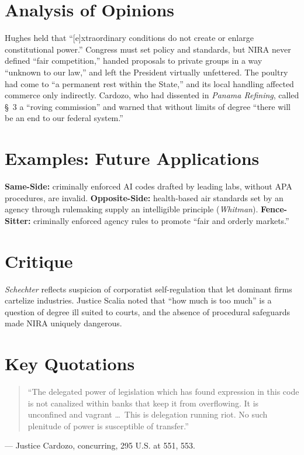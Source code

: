 \documentclass[12pt]{article}
\begin{document}
\section{Analysis of Opinions}
Hughes held that ``[e]xtraordinary conditions do not create or enlarge constitutional power.'' Congress must set policy and standards, but NIRA never defined ``fair competition,'' handed proposals to private groups in a way ``unknown to our law,'' and left the President virtually unfettered. The poultry had come to ``a permanent rest within the State,'' and its local handling affected commerce only indirectly. Cardozo, who had dissented in \textit{Panama Refining}, called \S~3 a ``roving commission'' and warned that without limits of degree ``there will be an end to our federal system.''

\section{Examples: Future Applications}
\textbf{Same-Side:} criminally enforced AI codes drafted by leading labs, without APA procedures, are invalid. \textbf{Opposite-Side:} health-based air standards set by an agency through rulemaking supply an intelligible principle (\textit{Whitman}). \textbf{Fence-Sitter:} criminally enforced agency rules to promote ``fair and orderly markets.''

\section{Critique}
\textit{Schechter} reflects suspicion of corporatist self-regulation that let dominant firms cartelize industries. Justice Scalia noted that ``how much is too much'' is a question of degree ill suited to courts, and the absence of procedural safeguards made NIRA uniquely dangerous.

\section{Key Quotations}
\begin{quote}
``The delegated power of legislation which has found expression in this code is not canalized within banks that keep it from overflowing. It is unconfined and vagrant \dots\ This is delegation running riot. No such plenitude of power is susceptible of transfer.''
\end{quote}
\noindent --- Justice Cardozo, concurring, 295 U.S. at 551, 553.
\end{document}
